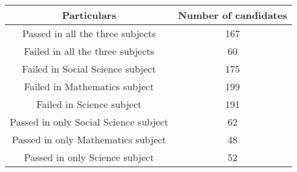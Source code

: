 \begin{tabular}{|c|c|}
\hline
\textbf{Particulars} & \textbf{Number of candidates} \\
\hline
Passed in all the three subjects & 167 \\
Failed in all the three subjects & 60 \\
Failed in Social Science subject & 175 \\
Failed in Mathematics subject & 199 \\
Failed in Science subject & 191 \\
Passed in only Social Science subject & 62 \\
Passed in only Mathematics subject & 48 \\
Passed in only Science subject & 52 \\
\hline
\end{tabular}
